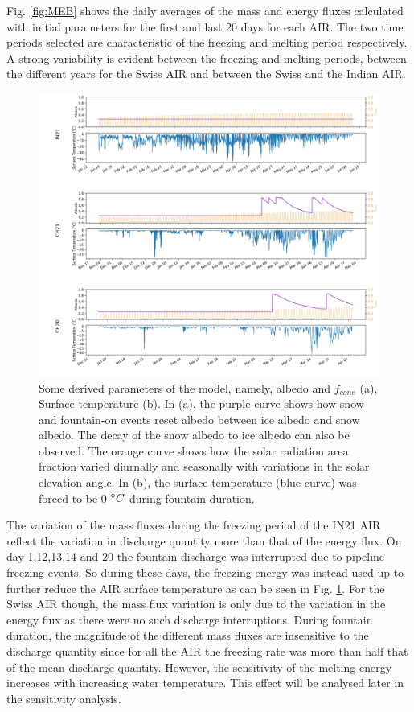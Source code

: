 \documentclass[utf8]{frontiersSCNS} %
\begin{document}
Fig. \ref{fig:MEB} shows the daily averages of the mass and energy fluxes calculated with initial parameters for the
first and last 20 days for each AIR. The two time periods selected are characteristic of the freezing and melting period
respectively. A strong variability is evident between the freezing and melting periods, between the different years for
the Swiss AIR and between the Swiss and the Indian AIR.

\begin{figure}
	\begin{center}
		\includegraphics[width=\linewidth]{Figures/albedo.jpg}
	\end{center}
	\caption{Some derived parameters of the model, namely, albedo and $f_{cone}$ (a), Surface temperature (b). In
		(a), the purple curve shows how snow and fountain-on events reset albedo between ice albedo and snow albedo.  The
		decay of the snow albedo to ice albedo can also be observed. The orange curve shows how the solar radiation area
		fraction varied diurnally and seasonally with variations in the solar elevation angle. In (b), the surface
		temperature (blue curve) was forced to be 0 $\degree C$ during fountain duration.}
	\label{fig:albedo}
\end{figure}

The variation of the mass fluxes during the freezing period of the IN21 AIR reflect the variation in discharge quantity
more than that of the energy flux. On day 1,12,13,14 and 20 the fountain discharge was interrupted due to pipeline
freezing events. So during these days, the freezing energy was instead used up to further reduce the AIR surface
temperature as can be seen in Fig. \ref{fig:albedo}. For the Swiss AIR though, the mass flux variation is only due to
the variation in the energy flux as there were no such discharge interruptions. During fountain duration, the magnitude
of the different mass fluxes are insensitive to the discharge quantity since for all the AIR the freezing rate was more
than half that of the mean discharge quantity. However, the sensitivity of the melting energy increases with increasing
water temperature. This effect will be analysed later in the sensitivity analysis.
\end{document}
